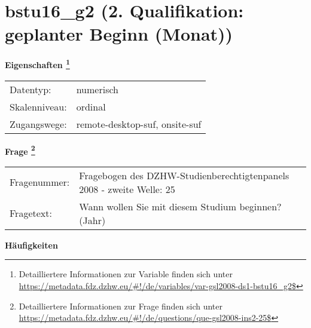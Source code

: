 
    \setcounter{footnote}{0}

    \vspace*{-1.8cm}
	\section{bstu16\_g2 (2. Qualifikation: geplanter Beginn (Monat))}
	\label{section:bstu16_g2}



    \vspace*{0.5cm}
    \noindent\textbf{Eigenschaften
	\footnote{Detailliertere Informationen zur Variable finden sich unter
		\url{https://metadata.fdz.dzhw.eu/\#!/de/variables/var-gsl2008-ds1-bstu16_g2$}}}\\
	\begin{tabularx}{\hsize}{@{}lX}
	Datentyp: & numerisch \\
	Skalenniveau: & ordinal \\
	Zugangswege: &
	  remote-desktop-suf, 
	  onsite-suf
 \\
    \end{tabularx}



				\vspace*{0.5cm}
                \noindent\textbf{Frage
	                \footnote{Detailliertere Informationen zur Frage finden sich unter
		              \url{https://metadata.fdz.dzhw.eu/\#!/de/questions/que-gsl2008-ins2-25$}}}\\
				\begin{tabularx}{\hsize}{@{}lX}
					Fragenummer: &
					  Fragebogen des DZHW-Studienberechtigtenpanels 2008 - zweite Welle:
					  25
 \\
					Fragetext: & Wann wollen Sie mit diesem Studium beginnen? (Jahr) \\
				\end{tabularx}





        		\vspace*{0.5cm}
                \noindent\textbf{Häufigkeiten}

